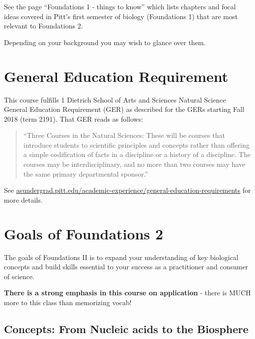 \documentclass[
]{book}
\begin{document}
See the page ``Foundations 1 - things to know'' which lists chapters and focal ideas covered in Pitt's first semester of biology (Foundations 1) that are most relevant to Foundations 2.

Depending on your background you may wish to glance over them.

\hypertarget{general-education-requirement}{%
\chapter{General Education Requirement}\label{general-education-requirement}}

This course fulfills 1 Dietrich School of Arts and Sciences Natural Science General Education Requirement (GER) as described for the GERs starting Fall 2018 (term 2191). That GER reads as follows:

\begin{quote}
``Three Courses in the Natural Sciences: These will be courses that introduce students to scientific principles and concepts rather than offering a simple codification of facts in a discipline or a history of a discipline. The courses may be interdisciplinary, and no more than two courses may have the same primary departmental sponsor.''
\end{quote}

See \href{https://asundergrad.pitt.edu/academic-experience/general-education-requirements}{asundergrad.pitt.edu/academic-experience/general-education-requirements} for more details.

\hypertarget{goals-of-foundations-2}{%
\chapter{Goals of Foundations 2}\label{goals-of-foundations-2}}

The goals of Foundations II is to expand your understanding of key biological concepts and build skills essential to your success as a practitioner and consumer of science.

\textbf{There is a strong emphasis in this course on application} - there is MUCH more to this class than memorizing vocab!

\hypertarget{concepts-from-nucleic-acids-to-the-biosphere}{%
\section{Concepts: From Nucleic acids to the Biosphere}\label{concepts-from-nucleic-acids-to-the-biosphere}}
\end{document}
